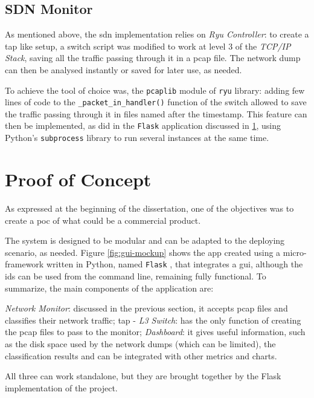 
\subsection{SDN Monitor}
\label{subsec:sdn-monitor}

As mentioned above, the \gls{sdn} implementation relies on \textit{Ryu Controller}: to create a \gls{tap} like setup, a switch script was modified to work at level 3 of the \textit{TCP/IP Stack}, saving all the traffic passing through it in a \gls{pcap} file. The network dump can then be analysed instantly or saved for later use, as needed.
\par To achieve the tool of choice was, the \texttt{pcaplib} module of \texttt{ryu} library: adding few lines of code to the \texttt{\_packet\_in\_handler()} function of the switch allowed to save the traffic passing through it in files named after the timestamp. This feature can then be implemented, as did in the \texttt{Flask} application discussed in \ref{sec:poc}, using Python's \texttt{subprocess} library to run several instances at the same time.


\section{Proof of Concept}
\label{sec:poc}

As expressed at the beginning of the dissertation, one of the objectives was to create a \gls{poc} of what could be a commercial product.
\par The system is designed to be modular and can be adapted to the deploying scenario, as needed. Figure \ref{fig:gui-mockup} shows the app created using a micro-framework written in Python, named \texttt{Flask} \cite{FlaskLibrary}, that integrates a \gls{gui}, although the \gls{ids} can be used from the command line, remaining fully functional. To summarize, the main components of the application are:

\begin{itemize}
    \itemAR \textit{Network Monitor}: discussed in the previous section, it accepts \gls{pcap} files and classifies their network traffic;
    \itemAR \gls{tap} - \textit{L3 Switch}: has the only function of creating the \gls{pcap} files to pass to the monitor;
    \itemAR \textit{Dashboard}: it gives useful information, such as the disk space used by the network dumps (which can be limited), the classification results and can be integrated with other metrics and charts.
\end{itemize}
All three can work standalone, but they are brought together by the Flask implementation of the project.

